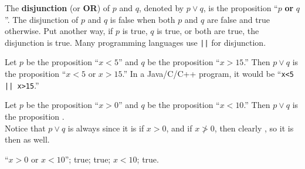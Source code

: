 \vspace*{-.1in} %

\begin{df}
The {\bf disjunction} (or {\bf OR}) of $p$ and $q$,
denoted by \boldmath$p\vee q$, is the proposition ``\boldmath$p$ {\bf or} \boldmath$q$''. 
The disjunction of $p$ and $q$
is false when both $p$ and $q$ are false and true otherwise.  Put another way, if $p$ is true, $q$ is true,
or both are true, the disjunction is true.
Many programming languages use \verb+||+ for disjunction.
\end{df}


\begin{exa}
Let $p$ be the proposition ``$x<5$'' and $q$ be the proposition ``$x>15$.''
Then $p\vee q$ is the proposition ``$x<5$ or $x>15$.''
In a Java/C/C++ program, it would be ``\verb+x<5 || x>15+.''
\end{exa}

\vspace*{-.1in} %

\begin{fib}
Let $p$ be the proposition ``$x>0$'' and $q$ be the proposition ``$x<10$.''
Then $p\vee q$ is the proposition \blanklinefill.\\
Notice that $p\vee q$ is always  since 
it is  if $x>0$, and if $x\not>0$, then clearly , so it is 
then as well.
\begin{answer}
``$x>0$ or $x<10$''; true; true; $x<10$; true.
\end{answer}
\end{fib}

\vspace*{-.1in} %

